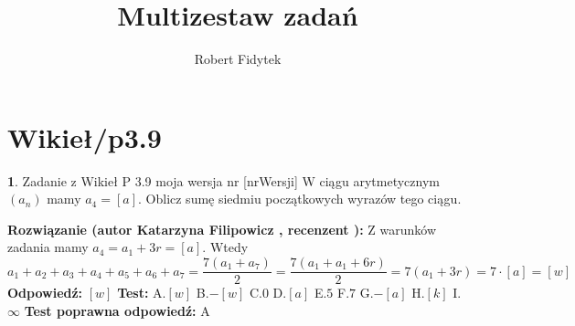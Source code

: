 \documentclass[12pt, a4paper]{article}
\title{Multizestaw zadań}
\author{Robert Fidytek}
\date{}
\theoremstyle{definition} %
\newtheorem{zad}{}
\newcommand{\kategoria}[1]{\section{#1}} %
\newcommand{\zadStart}[1]{\begin{zad}#1\newline} %
\newcommand{\zadStop}{\end{zad}}   %
\newcommand{\rozwStart}[2]{\noindent \textbf{Rozwiązanie (autor #1 , recenzent #2): }\newline} %
\newcommand{\rozwStop}{\newline}                                            %
\newcommand{\odpStart}{\noindent \textbf{Odpowiedź:}\newline}    %
\newcommand{\odpStop}{\newline}                                             %
\newcommand{\testStart}{\noindent \textbf{Test:}\newline} %
\newcommand{\testStop}{\newline} %
\newcommand{\kluczStart}{\noindent \textbf{Test poprawna odpowiedź:}\newline} %
\newcommand{\kluczStop}{\newline} %
\begin{document}
\maketitle


\kategoria{Wikieł/p3.9}
\zadStart{Zadanie z Wikieł P 3.9 moja wersja nr [nrWersji]}
W ciągu arytmetycznym $(a_n)$ mamy $a_4=[a]$. Oblicz sumę siedmiu początkowych wyrazów tego ciągu.
\zadStop
\rozwStart{Katarzyna Filipowicz}{}
Z warunków zadania mamy $a_4=a_1+3r=[a]$. Wtedy
$$
a_1+a_2+a_3+a_4+a_5+a_6+a_7=\frac{7(a_1+a_7)}{2}=\frac{7(a_1+a_1+6r)}{2}=7(a_1+3r)=7 \cdot [a] = [w]
$$
\rozwStop
\odpStart
$[w]$
\odpStop
\testStart
A.$[w]$
B.$-[w]$
C.$0$
D.$[a]$
E.$5$
F.$7$
G.$-[a]$
H.$[k]$
I.$\infty$
\testStop
\kluczStart
A
\kluczStop
\end{document}
